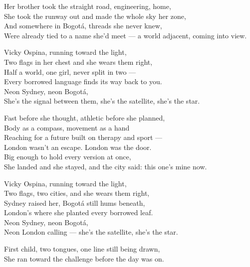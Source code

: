 \begin{lyrics}
Her brother took the straight road, engineering, home,\\
She took the runway out and made the whole sky her zone,\\
And somewhere in Bogotá, threads she never knew,\\
Were already tied to a name she'd meet — a world adjacent, coming into view.

Vicky Ospina, running toward the light,\\
Two flags in her chest and she wears them right,\\
Half a world, one girl, never split in two —\\
Every borrowed language finds its way back to you.\\
Neon Sydney, neon Bogotá,\\
She's the signal between them, she's the satellite, she's the star.

Fast before she thought, athletic before she planned,\\
Body as a compass, movement as a hand\\
Reaching for a future built on therapy and sport —\\
London wasn't an escape. London was the door.\\
Big enough to hold every version at once,\\
She landed and she stayed, and the city said: this one's mine now.

Vicky Ospina, running toward the light,\\
Two flags, two cities, and she wears them right,\\
Sydney raised her, Bogotá still hums beneath,\\
London's where she planted every borrowed leaf.\\
Neon Sydney, neon Bogotá,\\
Neon London calling — she's the satellite, she's the star.

First child, two tongues, one line still being drawn,\\
She ran toward the challenge before the day was on.
\end{lyrics}
